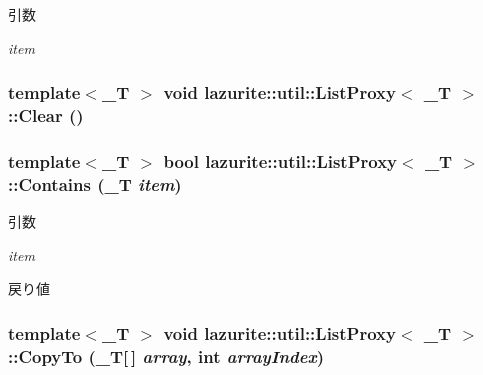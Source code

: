 \begin{DoxyParams}{引数}
\item[{\em item}]\end{DoxyParams}
\hypertarget{classlazurite_1_1util_1_1_list_proxy_3_01___t_01_4_a319f515b41d2c54b9c090130f344b5a4}{
\subsubsection[{Clear}]{\setlength{\rightskip}{0pt plus 5cm}template$<$\_\-T $>$ void lazurite::util::ListProxy$<$ \_\-T $>$::Clear ()}}
\label{classlazurite_1_1util_1_1_list_proxy_3_01___t_01_4_a319f515b41d2c54b9c090130f344b5a4}
\hypertarget{classlazurite_1_1util_1_1_list_proxy_3_01___t_01_4_a97b821ac9f0e40ad8e09f891dc95dc81}{
\subsubsection[{Contains}]{\setlength{\rightskip}{0pt plus 5cm}template$<$\_\-T $>$ bool lazurite::util::ListProxy$<$ \_\-T $>$::Contains (\_\-T {\em item})}}
\label{classlazurite_1_1util_1_1_list_proxy_3_01___t_01_4_a97b821ac9f0e40ad8e09f891dc95dc81}

\begin{DoxyParams}{引数}
\item[{\em item}]\end{DoxyParams}
\begin{DoxyReturn}{戻り値}

\end{DoxyReturn}
\hypertarget{classlazurite_1_1util_1_1_list_proxy_3_01___t_01_4_a108b024a0a14ea3bd359f56b2798bfdb}{
\subsubsection[{CopyTo}]{\setlength{\rightskip}{0pt plus 5cm}template$<$\_\-T $>$ void lazurite::util::ListProxy$<$ \_\-T $>$::CopyTo (\_\-T\mbox{[}$\,$\mbox{]} {\em array}, \/  int {\em arrayIndex})}}
\label{classlazurite_1_1util_1_1_list_proxy_3_01___t_01_4_a108b024a0a14ea3bd359f56b2798bfdb}

